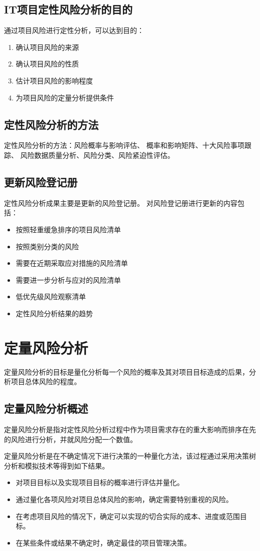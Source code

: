 \subsection{IT项目定性风险分析的目的}
通过项目风险进行定性分析，可以达到目的：
\begin{enumerate}
	\item 确认项目风险的来源
	\item 确认项目风险的性质
	\item 估计项目风险的影响程度
	\item 为项目风险的定量分析提供条件
\end{enumerate}
\subsection{定性风险分析的方法}
定性风险分析的方法：风险概率与影响评估、
概率和影响矩阵、十大风险事项跟踪、
风险数据质量分析、风险分类、风险紧迫性评估。
\subsection{更新风险登记册}
定性风险分析成果主要是更新的风险登记册。
对风险登记册进行更新的内容包括：
\begin{itemize}
	\item 按照轻重缓急排序的项目风险清单
	\item 按照类别分类的风险 
	\item 需要在近期采取应对措施的风险清单 
	\item 需要进一步分析与应对的风险清单 
	\item 低优先级风险观察清单 
	\item 定性风险分析结果的趋势 
\end{itemize}
\section{定量风险分析}
定量风险分析的目标是量化分析每一个风险的概率及其对项目目标造成的后果，分析项目总体风险的程度。
\subsection{定量风险分析概述}
定量风险分析是指对定性风险分析过程中作为项目需求存在的重大影响而排序在先的风险进行分析，并就风险分配一个数值。
\par 定量风险分析是在不确定情况下进行决策的一种量化方法，该过程通过采用决策树分析和模拟技术等得到如下结果。
\begin{itemize}
	\item 对项目目标以及实现项目目标的概率进行评估并量化。
	\item 通过量化各项风险对项目总体风险的影响，确定需要特别重视的风险。
	\item 在考虑项目风险的情况下，确定可以实现的切合实际的成本、进度或范围目标。
	\item 在某些条件或结果不确定时，确定最佳的项目管理决策。
\end{itemize}
